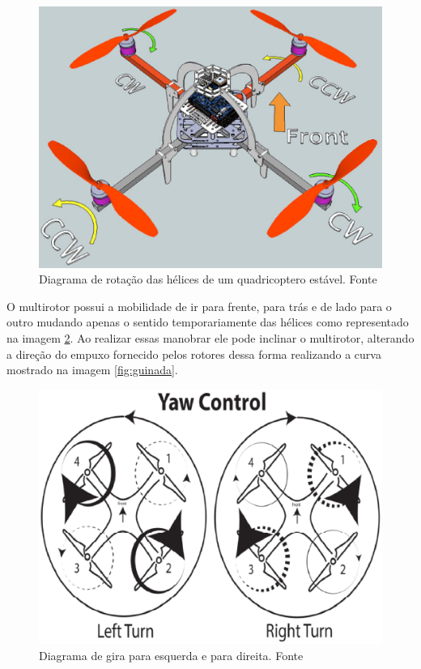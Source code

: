 \begin{figure}[H]
    \centering
      \includegraphics[keepaspectratio=true,scale=0.5]{figuras/rotacao.eps}
    \caption[Diagrama  de rotação das hélices de um quadricoptero estável]{Diagrama  de rotação das hélices de um quadricoptero estável. Fonte \cite{audronis}}
    \label{fig:rotacao}
\end{figure}

O multirotor possui a mobilidade de ir para frente, para trás e de lado para o outro mudando apenas o sentido temporariamente das hélices como representado na imagem \ref{fig:gira}. Ao realizar essas manobrar ele pode inclinar o multirotor, alterando a direção do empuxo fornecido pelos rotores dessa forma realizando a curva mostrado na imagem \ref{fig:guinada}.

\begin{figure}[H]
    \centering
      \includegraphics[keepaspectratio=true,scale=0.5]{figuras/gira.eps}
    \caption{Diagrama de gira para esquerda e para direita. Fonte \cite{audronis}}
    \label{fig:gira}
\end{figure}

